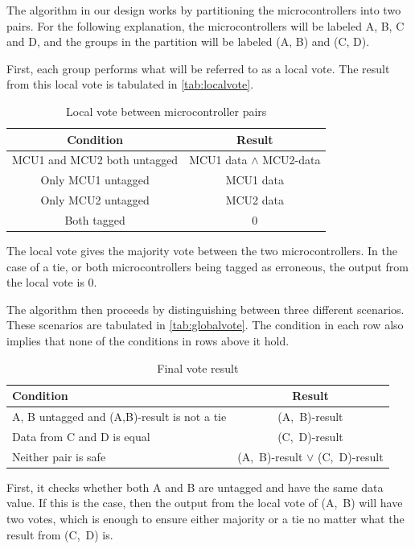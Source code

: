 The algorithm in our design works by partitioning the microcontrollers
into two pairs. For the following explanation, the microcontrollers
will be labeled A, B, C and D, and the groups in the partition will be
labeled (A, B) and (C, D).

First, each group performs what will be referred to as a local
vote. The result from this local vote is tabulated in
\autoref{tab:localvote}.

\begin{table}[htbp]
  \centering
  \caption{Local vote between microcontroller pairs}
  \begin{tabular}{|c|c|}
    \hline
    \textbf{Condition} & \textbf{Result} \\ \hline
    MCU1 and MCU2 both untagged & MCU1 data $\wedge$ MCU2-data \\ \hline
    Only MCU1 untagged & MCU1 data \\ \hline
    Only MCU2 untagged & MCU2 data \\ \hline
    Both tagged   & 0 \\ \hline
  \end{tabular}
  \label{tab:localvote}
\end{table}

The local vote gives the majority vote between the two
microcontrollers. In the case of a tie, or both microcontrollers being
tagged as erroneous, the output from the local vote is 0. 

The algorithm then proceeds by distinguishing between three different
scenarios. These scenarios are tabulated in
\autoref{tab:globalvote}. The condition in each row also implies that
none of the conditions in rows above it hold.

\begin{table}[htbp]
  \centering
  \caption{Final vote result}
  \begin{tabular}{|p{7cm}|c|}
    \hline
    \textbf{Condition} & \textbf{Result} \\ \hline
    A, B untagged and (A,B)-result is not a tie & (A,~B)-result \\ \hline
    Data from C and D is equal & (C,~D)-result \\ \hline
    Neither pair is safe  & (A,~B)-result $\vee$ (C,~D)-result \\ \hline
  \end{tabular}
  \label{tab:globalvote}
\end{table}

First, it checks whether both A and B are untagged and have the same
data value. If this is the case, then the output from the local vote
of (A,~B) will have two votes, which is enough to ensure either
majority or a tie no matter what the result from (C,~D) is.

